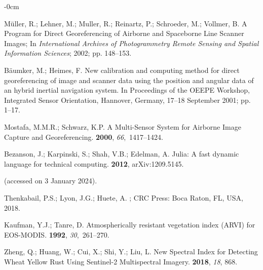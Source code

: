 \documentclass[remotesensing,article,accept,pdftex,moreauthors]{Definitions/mdpi}
\begin{document}
\begin{adjustwidth}{-\extralength}{0cm}
\begin{thebibliography}{999}
M{\"u}ller, R.; Lehner, M.; Muller, R.; Reinartz, P.; Schroeder, M.; Vollmer,
  B.
\newblock A Program for Direct Georeferencing of Airborne and Spaceborne Line
  Scanner Images;
\newblock In {\em International Archives of Photogrammetry Remote Sensing and 
  Spatial Information Sciences}; {2002}; pp. 148--153. %


B{\"a}umker, M.; Heimes, F.
\newblock New calibration and computing method for direct georeferencing of
  image and scanner data using the position and angular data of an hybrid
  inertial navigation system.
\newblock In Proceedings of the OEEPE Workshop, Integrated Sensor Orientation, Hannover, Germany,
 17--18 September  2001; pp. 1--17.

Mostafa, M.M.R.; Schwarz, K.P.
\newblock A Multi-Sensor System for Airborne Image Capture and Georeferencing.
 {\bf 2000}, {\em
  66},~1417--1424.

Bezanson, J.; Karpinski, S.; Shah, V.B.; Edelman, A.
\newblock Julia: A fast dynamic language for technical computing.
 {\bf 2012}, arXiv:1209.5145.

 (accessed on 3 January 2024).

Thenkabail, P.S.; Lyon, J.G.; Huete, A.
; CRC Press:  Boca Raton, FL, USA,
 2018.

Kaufman, Y.J.; Tanre, D.
\newblock Atmospherically resistant vegetation index (ARVI) for EOS-MODIS.
 {\bf 1992},
  {\em 30},~261--270.

Zheng, Q.; Huang, W.; Cui, X.; Shi, Y.; Liu, L.
\newblock New Spectral Index for Detecting Wheat Yellow Rust Using Sentinel-2
  Multispectral Imagery.
 {\bf 2018}, {\em 18}, 868.


\end{thebibliography}
\end{adjustwidth}
\end{document}
